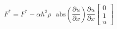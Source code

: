 \documentclass{article}
\title{}
\author{Brooks Karlik}
\date{\today}
\newcommand{\pd}[2]{\frac{\partial #1}{\partial #2}}
\newcommand{\abs}{\text{abs}}
\begin{document}
\maketitle
\newpage


$$
	F^*
	= 
	F^* 
	- 
	\alpha h^2 \rho
	\text{ }
	\abs
	\left(
		\pd{u}{x}
	\right)
	\pd{u}{x}
	\begin{bmatrix}
		0 \\
		1 \\
		u
	\end{bmatrix}
$$
\end{document}
